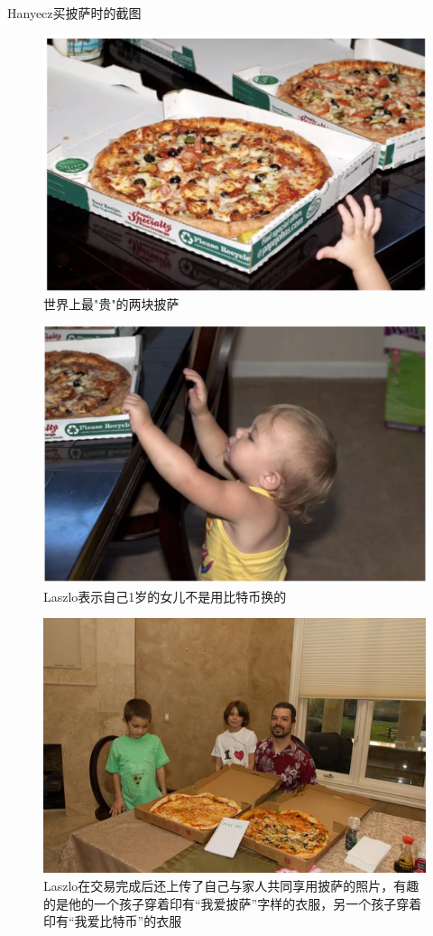 \documentclass[11pt]{beamer}
\begin{document}
\begin{frame}[allowframebreaks]{Hanyecz买披萨时的截图}
	\begin{figure}
		\centering
		\includegraphics[width=0.7\linewidth]{figures/pizza01}
		\caption{世界上最"贵"的两块披萨}
	\end{figure}

	\begin{figure}
		\centering
		\includegraphics[width=0.7\linewidth]{figures/pizza02}
		\caption{Laszlo表示自己1岁的女儿不是用比特币换的}
	\end{figure}

	\begin{figure}
		\centering
		\includegraphics[width=0.6\linewidth]{figures/pizzabybtc}
		\caption{Laszlo在交易完成后还上传了自己与家人共同享用披萨的照片，有趣的是他的一个孩子穿着印有“我爱披萨”字样的衣服，另一个孩子穿着印有“我爱比特币”的衣服}
		\label{fig:pizzabybtc}
	\end{figure}

\end{frame}
\end{document}
